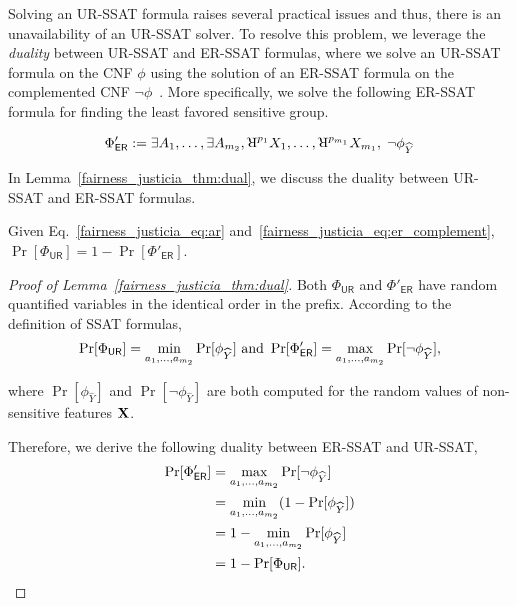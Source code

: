 Solving an UR-SSAT formula raises several practical issues and thus, there is an unavailability of an UR-SSAT solver. To resolve this problem, we leverage the \textit{duality} between UR-SSAT  and ER-SSAT formulas, where we solve an UR-SSAT formula on the CNF $ \phi $ using the solution of an ER-SSAT formula on the complemented CNF $ \neg \phi $~\cite{littman2001stochastic}. More specifically, we solve the following ER-SSAT formula for finding the least favored sensitive group.

\begin{equation}
	\Phi'_{\mathsf{ER}} := \exists A_1,\dots, \exists A_{\numsensitive},
	\R^{p_{1}}X_1, \dots, \R^{p_{\numnonsensitive}}X_{\numnonsensitive},   \; \neg \phi_{\widehat{Y}}
	\label{fairness_justicia_eq:er_complement}
\end{equation}


In Lemma~\ref{fairness_justicia_thm:dual}, we discuss the duality between UR-SSAT and ER-SSAT formulas.


\begin{lemma}\label{fairness_justicia_thm:dual}
Given Eq.~\eqref{fairness_justicia_eq:ar} and~\eqref{fairness_justicia_eq:er_complement},	$ \Pr[\Phi_{\mathsf{UR}}] = 1 - \Pr[\Phi'_{\mathsf{ER}}]  $.
\end{lemma}

\begin{proof}[Proof of Lemma~\ref{fairness_justicia_thm:dual}]
	Both $ \Phi_{\mathsf{UR}} $ and $ \Phi'_{\mathsf{ER}} $ have  random quantified variables in the identical order in the prefix. According to the definition of SSAT formulas,
	\begin{equation*}
	\Pr[\Phi_{\mathsf{UR}}] = \min\limits_{a_1, \dots,a_{m_2}} \Pr[\phi_{\widehat{Y}}] \text{ and } \Pr[\Phi'_{\mathsf{ER}}] = \max\limits_{a_1, \dots,a_{m_2}} \Pr[\neg\phi_{\widehat{Y}}],
	\end{equation*}
	
	where $ \Pr[\phi_{\widehat{Y}}] $ and $ \Pr[\neg \phi_{\widehat{Y}}] $ are both computed for the random values of non-sensitive features $ \mathbf{X} $.
	
	Therefore, we derive the following duality between ER-SSAT and UR-SSAT,
	\begin{equation}
	\begin{split}
	\Pr[\Phi'_{\mathsf{ER}}] &= \max\limits_{a_1, \dots,a_{m_2}} \Pr[\neg\phi_{\widehat{Y}}]  \\
	&= \min\limits_{a_1, \dots,a_{m_2}} (1 - \Pr[\phi_{\widehat{Y}}])\\
	&= 1 - \min\limits_{a_1, \dots,a_{m_2}}  \Pr[\phi_{\widehat{Y}}]\\
	&= 1 - \Pr[\Phi_{\mathsf{UR}}].\notag
	\end{split}
	\end{equation}
\end{proof}


